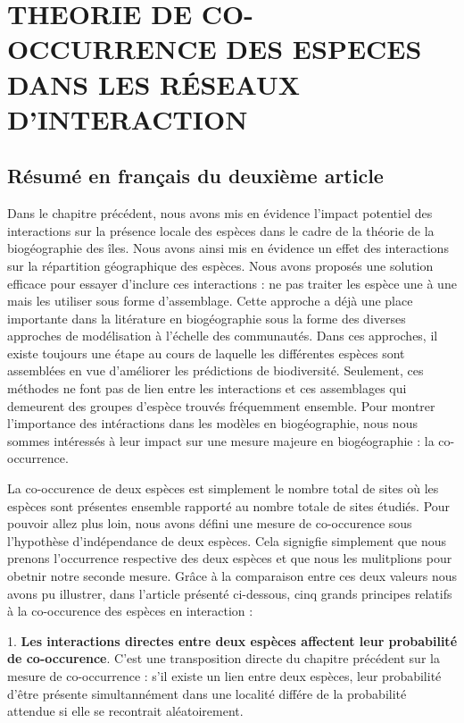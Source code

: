 \chapter{THEORIE DE CO-OCCURRENCE DES ESPECES DANS LES RÉSEAUX D'INTERACTION}


\section{Résumé en français du deuxième article}

Dans le chapitre précédent, nous avons mis en évidence l'impact potentiel des interactions sur la présence locale des espèces dans le cadre de la théorie de la biogéographie des îles. Nous avons ainsi mis en évidence un effet des interactions sur la répartition géographique des espèces. Nous avons proposés une solution efficace pour essayer d'inclure ces interactions : ne pas traiter les espèce une à une mais les utiliser sous forme d'assemblage. Cette approche a déjà une place importante dans la litérature en biogéographie sous la forme des diverses approches de modélisation à l'échelle des communautés. Dans ces approches, il existe toujours une étape au cours de laquelle les différentes espèces sont assemblées en vue d'améliorer les prédictions de biodiversité. Seulement, ces méthodes ne font pas de lien entre les interactions et ces assemblages qui demeurent des groupes d'espèce trouvés fréquemment ensemble. Pour montrer l'importance des intéractions dans les modèles en biogéographie, nous nous sommes intéressés à leur impact sur une mesure majeure en biogéographie : la co-occurrence.

La co-occurence de deux espèces est simplement le nombre total de sites où les espèces sont présentes ensemble rapporté au nombre totale de sites étudiés. Pour pouvoir allez plus loin, nous avons défini une mesure de co-occurence sous l'hypothèse d'indépendance de deux espèces. Cela signigfie simplement que nous prenons l'occurrence respective des deux espèces et que nous les mulitplions pour obetnir notre seconde mesure. Grâce à la comparaison entre ces deux valeurs nous avons pu illustrer, dans l'article présenté ci-dessous, cinq grands principes relatifs à la co-occurence des espèces en interaction :

1. \textbf{Les interactions directes entre deux espèces affectent leur probabilité de co-occurence}. C'est une transposition directe du chapitre précédent sur la mesure de co-occurrence : s'il existe un lien entre deux espèces, leur probabilité d'être présente simultannément dans une localité différe de la probabilité attendue si elle se recontrait aléatoirement.

